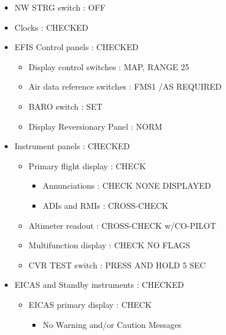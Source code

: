\begin{itemize}
\begin{itemize}
\end{itemize}

\item NW STRG switch : OFF

\item Clocks : CHECKED

\item EFIS Control panels : CHECKED

\begin{itemize}
\item Display control switches : MAP, RANGE 25

\item Air data reference switches : FMS1 \slash  AS REQUIRED

\item BARO switch : SET

\item Display Reversionary Panel : NORM

\end{itemize}

\item Instrument panels : CHECKED

\begin{itemize}
\item Primary flight display : CHECK

\begin{itemize}
\item Annunciations : CHECK NONE DISPLAYED

\item ADIs and RMIs : CROSS-CHECK

\end{itemize}

\item Altimeter readout : CROSS-CHECK w\slash  CO-PILOT

\item Multifunction display : CHECK NO FLAGS

\item CVR TEST switch : PRESS AND HOLD 5 SEC

\end{itemize}

\item EICAS and Standby instruments : CHECKED

\begin{itemize}
\item EICAS primary display : CHECK

\begin{itemize}
\item No Warning and\slash or Caution Messages


\end{itemize}
\end{itemize}
\end{itemize}
